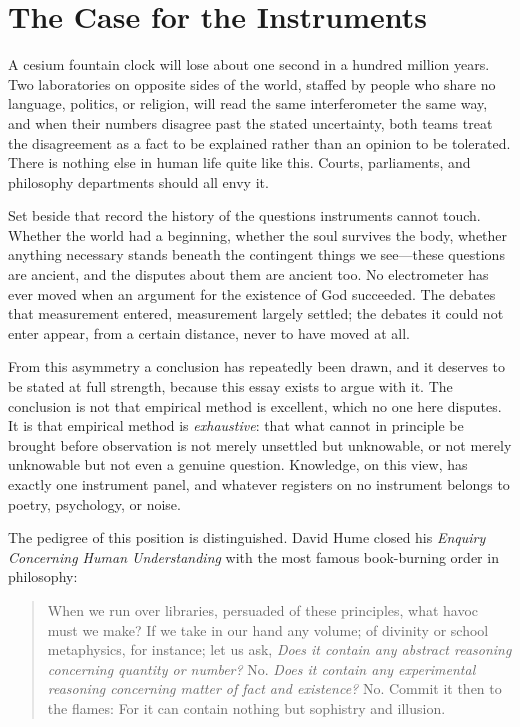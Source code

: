 \section{The Case for the Instruments}

A cesium fountain clock will lose about one second in a hundred million years. Two laboratories on opposite sides of the world, staffed by people who share no language, politics, or religion, will read the same interferometer the same way, and when their numbers disagree past the stated uncertainty, both teams treat the disagreement as a fact to be explained rather than an opinion to be tolerated. There is nothing else in human life quite like this. Courts, parliaments, and philosophy departments should all envy it.

Set beside that record the history of the questions instruments cannot touch. Whether the world had a beginning, whether the soul survives the body, whether anything necessary stands beneath the contingent things we see---these questions are ancient, and the disputes about them are ancient too. No electrometer has ever moved when an argument for the existence of God succeeded. The debates that measurement entered, measurement largely settled; the debates it could not enter appear, from a certain distance, never to have moved at all.

From this asymmetry a conclusion has repeatedly been drawn, and it deserves to be stated at full strength, because this essay exists to argue with it. The conclusion is not that empirical method is excellent, which no one here disputes. It is that empirical method is \emph{exhaustive}: that what cannot in principle be brought before observation is not merely unsettled but unknowable, or not merely unknowable but not even a genuine question. Knowledge, on this view, has exactly one instrument panel, and whatever registers on no instrument belongs to poetry, psychology, or noise.

The pedigree of this position is distinguished. David Hume closed his \emph{Enquiry Concerning Human Understanding} with the most famous book-burning order in philosophy:

\begin{quote}
When we run over libraries, persuaded of these principles, what havoc must we make? If we take in our hand any volume; of divinity or school metaphysics, for instance; let us ask, \emph{Does it contain any abstract reasoning concerning quantity or number?} No. \emph{Does it contain any experimental reasoning concerning matter of fact and existence?} No. Commit it then to the flames: For it can contain nothing but sophistry and illusion.
\end{quote}

